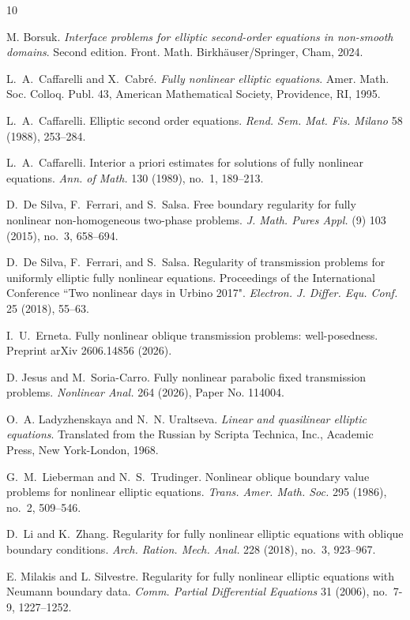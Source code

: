 \documentclass[letter,11pt]{amsart}
\theoremstyle{definition}
\numberwithin{equation}{section}
\begin{document}
\begin{thebibliography}{10}

M. Borsuk.
\textit{Interface problems for elliptic second-order equations in non-smooth domains}.
Second edition. Front. Math. Birkh\"{a}user/Springer, Cham, 2024.

L.~A.~Caffarelli and X.~Cabr\'{e}.
\emph{Fully nonlinear elliptic equations}.
Amer. Math. Soc. Colloq. Publ. 43, American Mathematical Society, Providence, RI, 1995.

L.~A.~Caffarelli.
Elliptic second order equations.
\textit{Rend. Sem. Mat. Fis. Milano} 58 (1988), 253--284.

L.~A.~Caffarelli.
Interior a priori estimates for solutions of fully nonlinear equations.
\textit{Ann. of Math.} 130 (1989), no.~1, 189--213.

D.~De Silva, F.~Ferrari, and S.~Salsa.
Free boundary regularity for fully nonlinear non-homogeneous two-phase problems.
\textit{J. Math. Pures Appl.} (9) 103 (2015), no.~3, 658--694.

D.~De Silva, F.~Ferrari, and S.~Salsa.
Regularity of transmission problems for uniformly elliptic fully nonlinear equations.
Proceedings of the International Conference ``Two nonlinear days in Urbino 2017".
\textit{Electron. J. Differ. Equ. Conf.} 25 (2018), 55--63.

I.~U.~Erneta.
Fully nonlinear oblique transmission problems: well-posedness.
Preprint arXiv 2606.14856 (2026).

D. Jesus and M.~Soria-Carro.
Fully nonlinear parabolic fixed transmission problems.
\textit{Nonlinear Anal.} 264 (2026), Paper No. 114004.

O.~A. Ladyzhenskaya and N.~N. Uraltseva.
\textit{Linear and quasilinear elliptic equations}.
Translated from the Russian by Scripta Technica, Inc., Academic Press, New York-London, 1968.

G.~M.~Lieberman and N.~S.~Trudinger.
Nonlinear oblique boundary value problems for nonlinear elliptic equations.
\textit{Trans. Amer. Math. Soc.} 295 (1986), no.~2, 509--546.

D.~Li and K.~Zhang.
Regularity for fully nonlinear elliptic equations with oblique boundary conditions.
\textit{Arch. Ration. Mech. Anal.} 228 (2018), no.~3, 923--967.

E. Milakis and L. Silvestre.
Regularity for fully nonlinear elliptic equations with Neumann boundary data.
\textit{Comm. Partial Differential Equations} 31 (2006), no.~7-9, 1227--1252.


\end{thebibliography}
\end{document}
